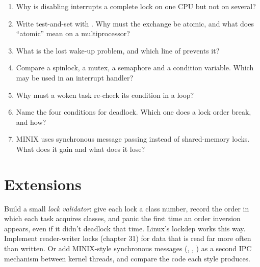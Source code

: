 \documentclass[11pt,a4paper]{article}
\begin{document}
\begin{questionbox}
\begin{enumerate}
  \item Why is disabling interrupts a complete lock on one CPU but not on several?
  \item Write test-and-set with . Why must the exchange be atomic, and what does ``atomic'' mean on a multiprocessor?
  \item What is the lost wake-up problem, and which line of  prevents it?
  \item Compare a spinlock, a mutex, a semaphore and a condition variable. Which may be used in an interrupt handler?
  \item Why must a woken task re-check its condition in a  loop?
  \item Name the four conditions for deadlock. Which one does a lock order break, and how?
  \item MINIX uses synchronous message passing instead of shared-memory locks. What does it gain and what does it lose?
\end{enumerate}
\end{questionbox}

\section{Extensions}

Build a small \emph{lock validator}: give each lock a class number, record the order in which each task acquires
classes, and panic the first time an order inversion appears, even if it didn't deadlock that time. Linux's lockdep
works this way. Implement reader-writer locks (\OSTEP chapter 31) for data that is read far more often than written.
Or add MINIX-style synchronous messages (, , ) as a second IPC mechanism
between kernel threads, and compare the code each style produces.

\booklegend
\end{document}
